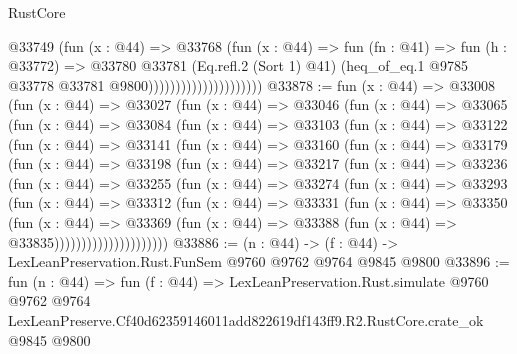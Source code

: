 \begin{lexlean}{RustCore}
\begin{coremodule}
                                      @33749
                                        (fun (x : @44) =>
                                        @33768
                                          (fun (x : @44) =>
                                          fun (fn : @41) =>
                                          fun (h : @33772) =>
                                          @33780
                                            @33781
                                            (Eq.refl.{2} (Sort 1) @41)
                                            (heq_of_eq.{1}
                                              @9785
                                              @33778
                                              @33781
                                              @9800)))))))))))))))))))))
@33878 := fun (x : @44) =>
  @33008
    (fun (x : @44) =>
    @33027
      (fun (x : @44) =>
      @33046
        (fun (x : @44) =>
        @33065
          (fun (x : @44) =>
          @33084
            (fun (x : @44) =>
            @33103
              (fun (x : @44) =>
              @33122
                (fun (x : @44) =>
                @33141
                  (fun (x : @44) =>
                  @33160
                    (fun (x : @44) =>
                    @33179
                      (fun (x : @44) =>
                      @33198
                        (fun (x : @44) =>
                        @33217
                          (fun (x : @44) =>
                          @33236
                            (fun (x : @44) =>
                            @33255
                              (fun (x : @44) =>
                              @33274
                                (fun (x : @44) =>
                                @33293
                                  (fun (x : @44) =>
                                  @33312
                                    (fun (x : @44) =>
                                    @33331
                                      (fun (x : @44) =>
                                      @33350
                                        (fun (x : @44) =>
                                        @33369
                                          (fun (x : @44) =>
                                          @33388 (fun (x : @44) => @33835)))))))))))))))))))))
@33886 := (n : @44) -> (f : @44) -> LexLeanPreservation.Rust.FunSem @9760 @9762 @9764 @9845 @9800
@33896 := fun (n : @44) =>
  fun (f : @44) =>
  LexLeanPreservation.Rust.simulate
    @9760
    @9762
    @9764
    LexLeanPreserve.Cf40d62359146011add822619df143ff9.R2.RustCore.crate_ok
    @9845
    @9800
\end{coremodule}
\end{lexlean}
